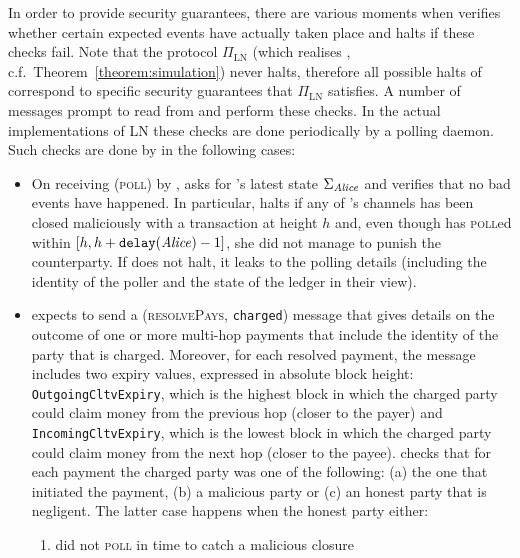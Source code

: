   In order to provide security guarantees, there are various moments when
  \fpaynet{} verifies whether certain expected events have actually taken place and halts if these checks fail. Note that the protocol $\Pi_{\mathrm{LN}}$
  (which realises \fpaynet, c.f.\ Theorem~\ref{theorem:simulation}) never halts,
  therefore all possible halts of \fpaynet{} correspond to specific security
  guarantees that $\Pi_{\mathrm{LN}}$ satisfies.
  A number of messages prompt \fpaynet{} to read from \ledger{} and perform
  these checks. In the actual implementations of LN these checks are done
  periodically by a polling daemon. Such checks are done by \fpaynet{} in the
  following cases:
  \begin{itemize}
    \item On receiving (\textsc{poll}) by \alice, \fpaynet{} asks \ledger{} for
    \alice's latest state $\Sigma_{\mathit{Alice}}$ and verifies that no bad
    events have happened. In particular, \fpaynet{} halts if any of \alice's
    channels has been closed maliciously with a transaction at height $h$ and,
    even though \alice{} has \textsc{poll}ed within $[h, h +
    \mathtt{delay}(\mathit{Alice}) - 1]$, she did not manage to punish the counterparty.
    If \fpaynet{} does not halt, it leaks to \simulator{} the polling
    details (including the identity of the poller and the state of the ledger in
    their view).
    \item \fpaynet{} expects \simulator{} to send a (\textsc{resolvePays},
    \texttt{charged}) message that gives details on the outcome of one or more
    multi-hop payments that include the identity of the party that is charged.
    Moreover, for each resolved payment, the message includes two expiry
    values, expressed in absolute block height:
    \texttt{OutgoingCltvExpiry}, which is the highest block in which
    the charged party could claim money from the previous hop (closer to the
    payer) and \texttt{IncomingCltvExpiry}, which is the
    lowest block in which the charged party could claim money from the
    next hop (closer to the payee). \fpaynet{} checks that for each
    payment the charged party was one of the following: (a) the one that
    initiated the payment, (b) a malicious party or (c) an honest party that is
    negligent. The latter case happens when the honest party either:
    \begin{enumerate}
      \item did not \textsc{poll} in time to catch a malicious closure

\end{enumerate}
\end{itemize}
